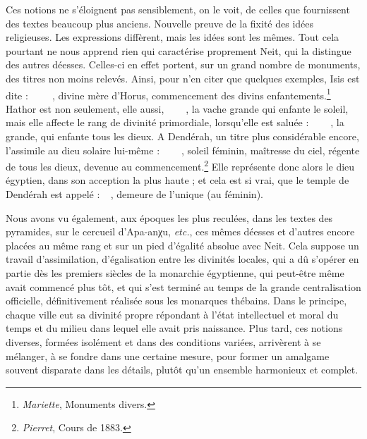 \documentclass[a4paper, 11pt, oneside]{article}
\newcommand*\hieroAAAG{}
\newcommand*\hieroAAAH{}
\newcommand*\hieroAABC{\raisebox{0.5ex}{}}
\newcommand*\hieroAACB{\raisebox{0.5ex}{}}
\newcommand*\hieroAACN{\raisebox{1ex}{}}
\newcommand*\hieroAACS{}
\newcommand*\hieroAAEK{}
\newcommand*\hieroAAHN{}
\newcommand*\hieroAAII{}
\newcommand*\hieroAAKH{}
\newcommand*\hieroAAKO{}
\newcommand*\hieroAALA{}
\newcommand*\hieroAAMP{}
\newcommand*\hieroAANA{}
\newcommand*\hieroAANB{}
\newcommand*\hieroAANC{}
\newcommand*\hieroAANP{}
\newcommand*\hieroAAON{}
\newcommand*\hieroAAPH{}
\newcommand*\hieroAAXQ{\raisebox{0.5ex}{}}
\newcommand*\hieroAAZI{}
\newcommand*\hieroAAZN{}
\newcommand*\hieroABAM{}
\newcommand*\hieroABAN{}
\newcommand*\hieroABAO{}
\newcommand*\hieroABAP{}
\newcommand*\hieroABAQ{}
\newcommand*\hieroABAR{}
\newcommand*\hieroABAS{}
\newcommand*\hieroABAT{}
\newcommand*\hieroABAU{\raisebox{0.5ex}{}}
\begin{document}
Ces notions ne s'éloignent pas sensiblement, on le voit, de celles que fournissent des textes beaucoup plus anciens. Nouvelle preuve de la fixité des idées religieuses. Les expressions diffèrent, mais les idées sont les mêmes. Tout cela pourtant ne nous apprend rien qui caractérise proprement Neit, qui la distingue des autres déesses. Celles-ci en effet portent, sur un grand nombre de monuments, des titres non moins relevés. Ainsi, pour n'en citer que quelques exemples, Isis est dite : $\hieroAAEK\:\hieroAAKO\:\hieroAACN\allowbreak\:\hieroAAON\:\hieroAAEK\:\hieroABAM\allowbreak\:\hieroAAMP\:\hieroAAEK\allowbreak\:\hieroAANC\:\hieroABAN$, divine mère d'Horus, commencement des divins enfantements.\footnote{\emph{Mariette}, Monuments divers.} Hathor est non seulement, elle aussi, $\hieroAAAH\:\hieroAANA\:\hieroAANB\allowbreak\:\hieroAAII\:\hieroAAZI\:\hieroAANC\allowbreak\:\hieroAACS\:\hieroAAZN\:\hieroAAXQ$, la vache grande qui enfante le soleil, mais elle affecte le rang de divinité primordiale, lorsqu'elle est saluée : $\hieroAACB\:\hieroAAAG\:\hieroAAZI\allowbreak\:\hieroAANC\:\hieroAACS\:\hieroAAEK\allowbreak\:\hieroAAEK\:\hieroAAEK\:\hieroAAKH$, la grande, qui enfante tous les dieux. A Dendérah, un titre plus considérable encore, l'assimile au dieu solaire lui-même : $\hieroABAO\:\hieroAABC\:\hieroAAPH\allowbreak\:\hieroABAP\:\hieroABAQ\:\hieroABAR\allowbreak\:\hieroABAS\:\hieroAANP\:\hieroABAT$, soleil féminin, maîtresse du ciel, régente de tous les dieux, devenue au commencement.\footnote{\emph{Pierret}, Cours de 1883.} Elle représente donc alors le dieu égyptien, dans son acception la plus haute ; et cela est si vrai, que le temple de Dendérah est appelé : $\hieroAAHN\:\hieroABAU\allowbreak\:\hieroAAII\:\hieroAALA$, demeure de l'unique (au féminin).

Nous avons vu également, aux époques les plus reculées, dans les textes des pyramides, sur le cercueil d'Apa-anχu, \emph{etc.}, ces mêmes déesses et d'autres encore placées au même rang et sur un pied d'égalité absolue avec Neit. Cela suppose un travail d'assimilation, d'égalisation entre les divinités locales, qui a dû s'opérer en partie dès les premiers siècles de la monarchie égyptienne, qui peut-être même avait commencé plus tôt, et qui s'est terminé au temps de la grande centralisation officielle, définitivement réalisée sous les monarques thébains. Dans le principe, chaque ville eut sa divinité propre répondant à l'état intellectuel et moral du temps et du milieu dans lequel elle avait pris naissance. Plus tard, ces notions diverses, formées isolément et dans des conditions variées, arrivèrent à se mélanger, à se fondre dans une certaine mesure, pour former un amalgame souvent disparate dans les détails, plutôt qu'un ensemble harmonieux et complet.
\end{document}
